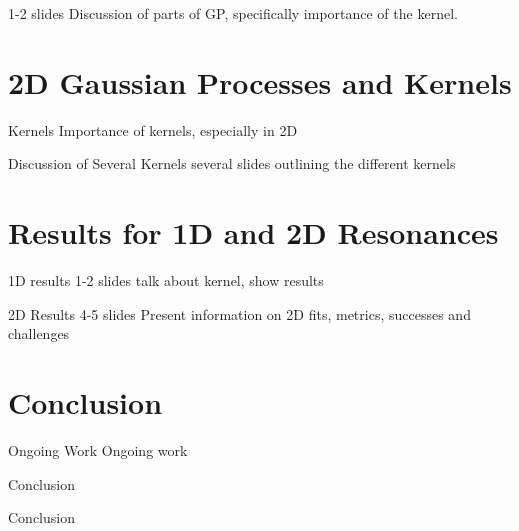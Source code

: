 \documentclass[10pt]{beamer}
\begin{document}
\begin{frame}{}
  
\end{frame}

\begin{frame}{}
  1-2 slides
  Discussion of parts of GP, specifically importance of the kernel.
\end{frame}


\section{2D Gaussian Processes and Kernels}
\label{sec:2d-gauss-proc}
\begin{frame}{Kernels}
  Importance of kernels, especially in 2D
\end{frame}

\begin{frame}{Discussion of Several Kernels}
  several slides outlining the different kernels 
\end{frame}

\section{Results for 1D and 2D Resonances}
\label{sec:results-1d-2d}
\begin{frame}{1D results}
  1-2 slides
  talk about kernel, show results
\end{frame}


\begin{frame}{2D Results}
  4-5 slides
  Present information on 2D fits, metrics, successes and challenges
\end{frame}


\section{Conclusion}
\label{sec:conclusion}

\begin{frame}{Ongoing Work}
Ongoing work
  
\end{frame}

\begin{frame}{Conclusion}

  Conclusion
  
\end{frame}
\end{document}
